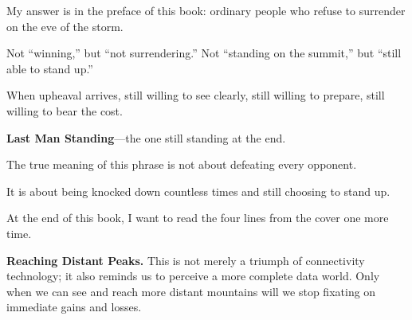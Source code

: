 \vspace{1em}

My answer is in the preface of this book: ordinary people who refuse to surrender on the eve of the storm.

Not ``winning,'' but ``not surrendering.'' Not ``standing on the summit,'' but ``still able to stand up.''

When upheaval arrives, still willing to see clearly, still willing to prepare, still willing to bear the cost.

\vspace{1em}

\textbf{Last Man Standing}---the one still standing at the end.

The true meaning of this phrase is not about defeating every opponent.

It is about being knocked down countless times and still choosing to stand up.














\vspace{1em}


At the end of this book, I want to read the four lines from the cover one more time.

\textbf{Reaching Distant Peaks.}
This is not merely a triumph of connectivity technology; it also reminds us to perceive a more complete data world. Only when we can see and reach more distant mountains will we stop fixating on immediate gains and losses.

\vspace{1em}

